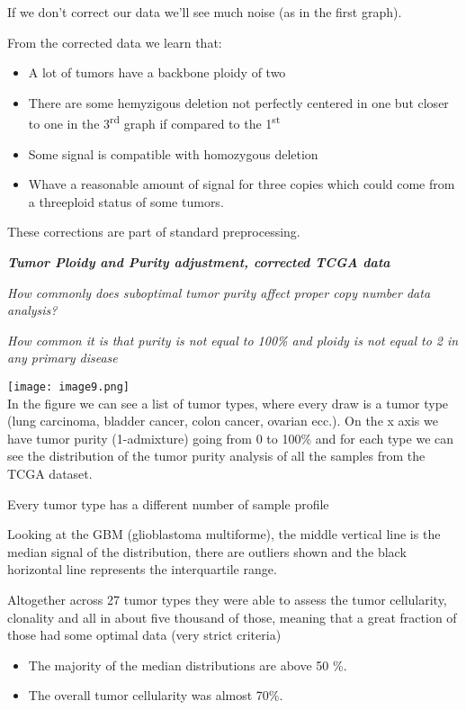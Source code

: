 If we don't correct our data we'll see much noise (as in the first graph).

From the corrected data we learn that:

\begin{itemize}
\item
  A lot of tumors have a backbone ploidy of two
\item
  There are some hemyzigous deletion not perfectly centered in one but closer to
  one in the 3\textsuperscript{rd} graph if compared to the
  1\textsuperscript{st}
\item
  Some signal is compatible with homozygous deletion
\item
  Whave a reasonable amount of signal for three copies which could come from a
  threeploid status of some tumors.
\end{itemize}

These corrections are part of standard preprocessing.

\emph{\textbf{Tumor Ploidy and Purity adjustment, corrected TCGA data}}

\emph{How commonly does suboptimal tumor purity affect proper copy number data
analysis?}

\emph{How common it is that purity is not equal to 100\% and ploidy is not equal
to 2 in any primary disease}

\texttt{[image: image9.png]}\\

In the figure we can see a list of tumor types, where every draw is a tumor type
(lung carcinoma, bladder cancer, colon cancer, ovarian ecc.). On the x axis we
have tumor purity (1-admixture) going from 0 to 100\% and for each type we can
see the distribution of the tumor purity analysis of all the samples from the
TCGA dataset.

Every tumor type has a different number of sample profile

Looking at the GBM (glioblastoma multiforme), the middle vertical line is the
median signal of the distribution, there are outliers shown and the black
horizontal line represents the interquartile range.

Altogether across 27 tumor types they were able to assess the tumor cellularity,
clonality and all in about five thousand of those, meaning that a great fraction
of those had some optimal data (very strict criteria)

\begin{itemize}
\item
  The majority of the median distributions are above 50 \%.
\item
  The overall tumor cellularity was almost 70\%.
\end{itemize}

